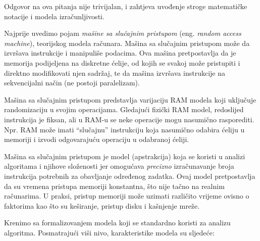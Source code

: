 Odgovor na ova pitanja nije trivijalan, i zahtjeva uvođenje stroge matematičke notacije i modela izračunljivosti. 

Najprije uvedimo pojam \textit{mašine sa slučajnim pristupom} (eng. \textit{random access machine}), teorijskog modela računara.  Mašina sa slučajnim pristupom može da izvršava instrukcije i manipuliše podacima. Ova mašina pretpostavlja da je memorija  %
podijeljena na diskretne ćelije, od kojih se svakoj može pristupiti i direktno modifikovati njen sadržaj, te da mašina izvršava instrukcije na sekvencijalni način (ne postoji paralelizam).

Mašina sa slučajnim pristupom predstavlja varijaciju RAM modela koji uključuje randomizaciju u svojim operacijama. Gledajući fizički RAM model, redoslijed instrukcija je fiksan, ali u RAM-u se neke operacije mogu nasumično rasporediti. Npr. RAM može imati ``slučajnu''  instrukciju koja nasumično odabira ćeliju u memoriji i izvodi odgovarajuću operaciju u odabranoj ćeliji.

Mašina sa slučajnim pristupom je model (apstrakcija) koja se koristi u analizi algoritama i njihove složenosti jer omogućava \textit{precizno} izračunavanje broja instrukcija potrebnih za obavljanje određenog zadatka. Ovaj model pretpostavlja da su vremena pristupa memoriji konstantna, što nije tačno na realnim računarima. U praksi, pristup memoriji može uzimati različito vrijeme ovisno o faktorima kao što su keširanje, pristup disku i kašnjenje mreže.

Krenimo sa formalizovanjem modela koji 
se standardno koristi za analizu algoritma.  Posmatrajući viši nivo,   karakteristike modela su sljedeće:

